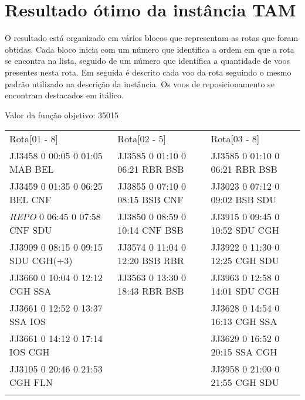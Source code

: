 \chapter{Resultado ótimo da instância TAM}\label{anx:resulttam}


O resultado está organizado em vários blocos que representam as rotas que foram
obtidas. Cada bloco inicia com um número que identifica a ordem em que a rota se
encontra na lista, seguido de um número que identifica a quantidade de voos
presentes nesta rota. Em seguida é descrito cada voo da rota seguindo o mesmo
padrão utilizado na descrição da instância. Os voos de reposicionamento se
encontram destacados em itálico.

Valor da função objetivo: 35015

\begin{scriptsize}

\begin{longtable}{l l l}

Rota[01 - 8]  & Rota[02 - 5]  & Rota[03 - 8] \\
JJ3458 0 00:05 0 01:05 MAB BEL & JJ3585 0 01:10 0 06:21 RBR BSB & JJ3585 0 01:10 0 06:21 RBR BSB\\
JJ3459 0 01:35 0 06:25 BEL CNF & JJ3855 0 07:10 0 08:15 BSB CNF & JJ3023 0 07:12 0 09:02 BSB SDU\\
\textit{REPO}   0 06:45 0 07:58 CNF SDU & JJ3850 0 08:59 0 10:14 CNF BSB &
JJ3915 0 09:45 0 10:52 SDU CGH\\ 
JJ3909 0 08:15 0 09:15 SDU CGH(+3) & JJ3574 0 11:04 0 12:20 BSB RBR & JJ3922 0
11:30 0 12:25 CGH SDU\\ 
JJ3660 0 10:04 0 12:12 CGH SSA & JJ3563 0 13:30 0 18:43 RBR BSB & JJ3963 0 12:58 0 14:01 SDU CGH\\
JJ3661 0 12:52 0 13:37 SSA IOS & & JJ3628 0 14:54 0 16:13 CGH SSA\\
JJ3661 0 14:12 0 17:14 IOS CGH & & JJ3629 0 16:52 0 20:15 SSA CGH\\
JJ3105 0 20:46 0 21:53 CGH FLN & & JJ3958 0 21:00 0 21:55 CGH SDU\\

\\


\end{longtable}
\end{scriptsize}
